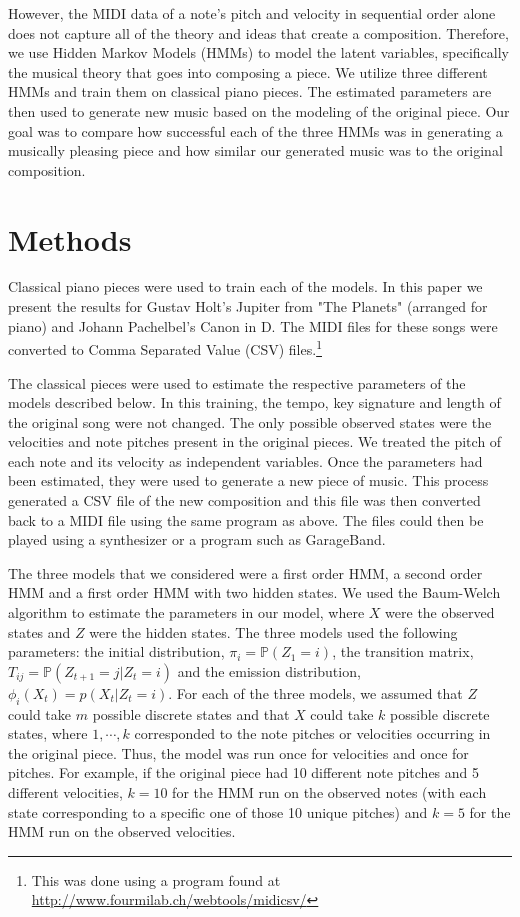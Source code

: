 \documentclass{article} %
\begin{document}
However, the MIDI data of a note's pitch and velocity in sequential order alone does not capture all of the theory and ideas that create a composition. Therefore, we use Hidden Markov Models (HMMs) to model the latent variables, specifically the musical theory that goes into composing a piece. We utilize three different HMMs and train them on classical piano pieces. The estimated parameters are then used to generate new music based on the modeling of the original piece.  Our goal was to compare how successful each of the three HMMs was in generating a musically pleasing piece and how similar our generated music was to the original composition.

\section{Methods}

Classical piano pieces were used to train each of the models. In this paper we present the results for Gustav Holt's Jupiter from "The Planets" (arranged for piano) and Johann Pachelbel's Canon in D. The MIDI files for these songs were converted to Comma Separated Value (CSV) files.\footnote{This was done using a program found at \url{http://www.fourmilab.ch/webtools/midicsv/}} 

The classical pieces were used to estimate the respective parameters of the models described below. In this training, the tempo, key signature and length of the original song were not changed. The only possible observed states were the velocities and note pitches present in the original pieces. We treated the pitch of each note and its velocity as independent variables.  Once the parameters had been estimated, they were used to generate a new piece of music. This process generated a CSV file of the new composition and this file was then converted back to a MIDI file using the same program as above. The files could then be played using a synthesizer or a program such as GarageBand.

The three models that we considered were a first order HMM, a second order HMM and a first order HMM with two hidden states.  We used the Baum-Welch algorithm  to estimate the parameters in our model, where $X$ were the observed states and $Z$ were the hidden states.  The three models used the following parameters: the initial distribution, $\pi_i = \mathbb{P}(Z_1 = i)$, the transition matrix, $T_{ij} = \mathbb{P}(Z_{t+1} = j | Z_t = i)$ and the emission distribution, $\phi_i (X_t) = p(X_t | Z_t = i)$. For each of the three models, we assumed that $Z$ could take $m$ possible discrete states and that $X$ could take $k$  possible discrete states, where $1, \cdots, k$ corresponded to the note pitches or velocities occurring in the original piece. Thus, the model was run once for velocities and once for pitches. For example, if the original piece had 10 different note pitches and 5 different velocities, $k=10$ for the HMM run on the observed notes (with each state corresponding to a specific one of those 10 unique pitches) and $k=5$ for the HMM run on the observed velocities.  
\end{document}
